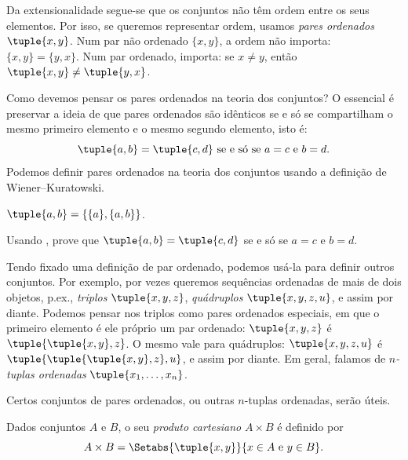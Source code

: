 \documentclass[../../../include/open-logic-section]{subfiles}
\begin{document}

\begin{explain}
Da extensionalidade segue-se que os conjuntos não têm ordem entre os seus
elementos. Por isso, se queremos representar ordem, usamos \emph{pares ordenados}
$\tuple{x, y}$. Num par não ordenado $\{x, y\}$, a ordem não
importa: $\{x, y\} = \{y, x\}$. Num par ordenado, importa: se $x
\neq y$, então $\tuple{x, y} \neq \tuple{y, x}$.

Como devemos pensar os pares ordenados na teoria dos conjuntos? O essencial é
preservar a ideia de que pares ordenados são idênticos se e só se
compartilham o mesmo primeiro elemento e o mesmo segundo elemento, isto é:
\[
  \tuple{a, b}= \tuple{c, d}\text{ se e só se }a = c \text{ e }b=d.
\]
Podemos definir pares ordenados na teoria dos conjuntos usando a definição de
Wiener--Kuratowski.
\end{explain}

\begin{defn}
	$\tuple{a, b} = \{\{a\}, \{a, b\}\}$.
\end{defn}

\begin{prob}
	Usando , prove que $\tuple{a,
	b}= \tuple{c, d}$ se e só se $a = c$ e $b=d$.
\end{prob}

\begin{explain}
Tendo fixado uma definição de par ordenado, podemos usá-la para definir
outros conjuntos. Por exemplo, por vezes queremos sequências ordenadas de
mais de dois objetos, p.ex., \emph{triplos} $\tuple{x, y, z}$,
\emph{quádruplos} $\tuple{x, y, z, u}$, e assim por diante.  Podemos pensar nos
triplos como pares ordenados especiais, em que o primeiro elemento é ele próprio um
par ordenado: $\tuple{x, y, z}$ é $\tuple{\tuple{x, y},z}$. O mesmo
vale para quádruplos: $\tuple{x,y,z,u}$ é
$\tuple{\tuple{\tuple{x,y},z},u}$, e assim por diante. Em geral, falamos de
\emph{$n$-tuplas ordenadas} $\tuple{x_1, \dots, x_n}$.

Certos conjuntos de pares ordenados, ou outras $n$-tuplas ordenadas, serão úteis.
\end{explain}

\begin{defn}
Dados conjuntos $A$ e $B$, o seu \emph{produto cartesiano} $A \times B$ é
definido por
\[
  A \times B = \Setabs{\tuple{x, y}}{x \in A \text{ e } y \in B}.
\]
\end{defn}
\end{document}
